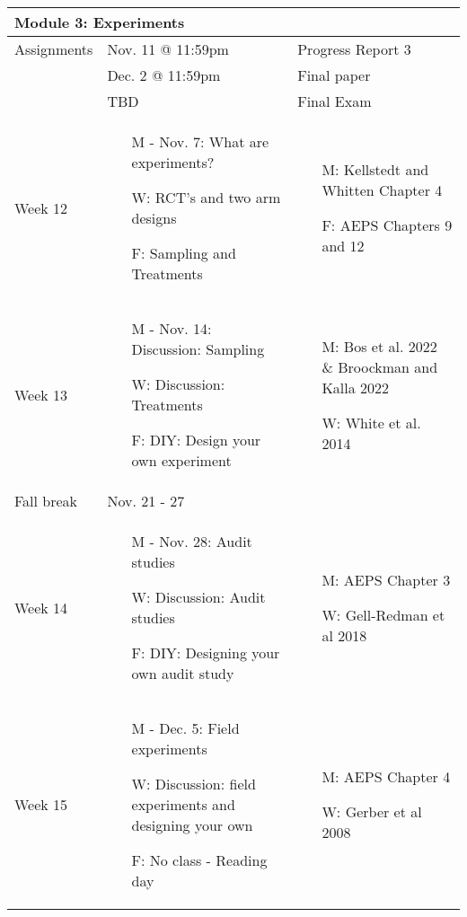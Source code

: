 \documentclass[11pt, a4paper]{article}
\begin{document}
\begin{longtable}[hbt!]{p{}p{}p{}}
        \hline
        \multicolumn{3}{l}{\textbf{Module 3: Experiments}} \\
        \hline
        Assignments & Nov. 11 @ 11:59pm & Progress Report 3 \\
            & Dec. 2 @ 11:59pm & Final paper \\
            & TBD & Final Exam \\
        \hline 
        Week 12 & \begin{itemize} \item[M - Nov. 7:] What are experiments? \item[W:] RCT's and two arm designs \item[F:] Sampling and Treatments \end{itemize} & \begin{itemize} \item[M:] Kellstedt and Whitten Chapter 4 \item[F:] AEPS Chapters 9 and 12 \end{itemize} \\
        \hline 
        Week 13 & \begin{itemize} \item[M - Nov. 14:] Discussion: Sampling  \item[W:] Discussion: Treatments \item[F:] DIY: Design your own experiment  \end{itemize} & \begin{itemize} \item[M:] Bos et al. 2022 \& Broockman and Kalla 2022 \item[W:] White  et al. 2014 \end{itemize}\\
        \hline
        Fall break & Nov. 21 - 27 & \\
        \hline
        Week 14 & \begin{itemize} \item[M - Nov. 28:] Audit studies \item[W:] Discussion: Audit studies \item[F:] DIY: Designing your own audit study \end{itemize} & \begin{itemize} \item[M:] AEPS Chapter 3 \item[W:] Gell-Redman et al 2018 \end{itemize} \\
        \hline
        Week 15 & \begin{itemize} \item[M - Dec. 5:] Field experiments \item[W:] Discussion: field experiments and designing your own \item[F:] No class - Reading day \end{itemize} & \begin{itemize} \item[M:] AEPS Chapter 4  \item[W:] Gerber et al 2008 \end{itemize} \\

\end{longtable}
\end{document}
